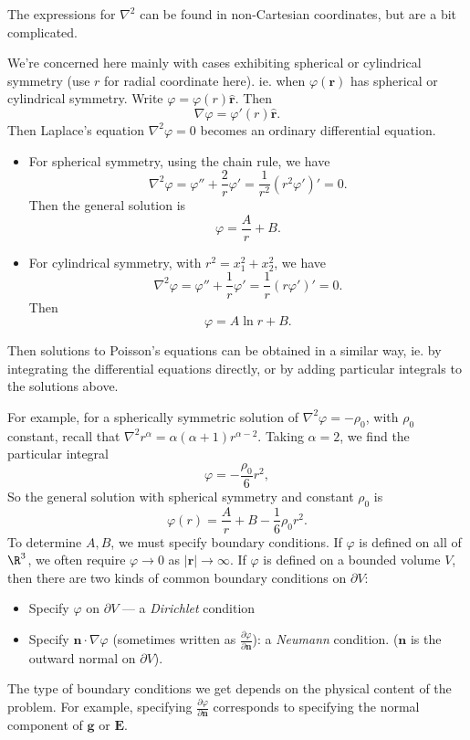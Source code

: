 \documentclass[a4paper]{article}
\begin{document}
The expressions for $\nabla^2$ can be found in non-Cartesian coordinates, but are a bit complicated.

We're concerned here mainly with cases exhibiting spherical or cylindrical symmetry (use $r$ for radial coordinate here). ie. when $\varphi(\mathbf{r})$ has spherical or cylindrical symmetry. Write $\varphi = \varphi(r) \hat{\mathbf{r}}$. Then
\[
  \nabla \varphi = \varphi'(r)\hat{\mathbf{r}}.
\]
Then Laplace's equation $\nabla^2 \varphi = 0$ becomes an ordinary differential equation.
\begin{itemize}
  \item For spherical symmetry, using the chain rule, we have
    \[
      \nabla^2 \varphi = \varphi'' + \frac{2}{r}\varphi' = \frac{1}{r^2}(r^2\varphi')' = 0.
    \]
    Then the general solution is
    \[
      \varphi = \frac{A}{r} + B.
    \]
  \item For cylindrical symmetry, with $r^2 = x_1^2 + x_2^2$, we have
    \[
      \nabla^2 \varphi = \varphi'' + \frac{1}{r}\varphi' = \frac{1}{r}(r\varphi')' = 0.
    \]
    Then
    \[
      \varphi = A\ln r + B.
    \]
\end{itemize}
Then solutions to Poisson's equations can be obtained in a similar way, ie. by integrating the differential equations directly, or by adding particular integrals to the solutions above.

For example, for a spherically symmetric solution of $\nabla^2 \varphi = -\rho_0$, with $\rho_0$ constant, recall that $\nabla^2 r^\alpha = \alpha(\alpha + 1)r^{\alpha - 2}$. Taking $\alpha = 2$, we find the particular integral
\[
  \varphi = -\frac{\rho_0}{6}r^2,
\]
So the general solution with spherical symmetry and constant $\rho_0$ is
\[
  \varphi(r) = \frac{A}{r} + B - \frac{1}{6}\rho_0 r^2.
\]
To determine $A, B$, we must specify boundary conditions. If $\varphi$ is defined on all of $\R^3$, we often require $\varphi \to 0$ as $|\mathbf{r}| \to \infty$. If $\varphi$ is defined on a bounded volume $V$, then there are two kinds of common boundary conditions on $\partial V$:
\begin{itemize}
  \item Specify $\varphi$ on $\partial V$ --- a \emph{Dirichlet} condition
  \item Specify $\mathbf{n}\cdot \nabla \varphi$ (sometimes written as $\frac{\partial \varphi}{\partial \mathbf{n}}$): a \emph{Neumann} condition. ($\mathbf{n}$ is the outward normal on $\partial V$).
\end{itemize}
The type of boundary conditions we get depends on the physical content of the problem. For example, specifying $\frac{\partial \varphi}{\partial \mathbf{n}}$ corresponds to specifying the normal component of $\mathbf{g}$ or $\mathbf{E}$.
\end{document}
